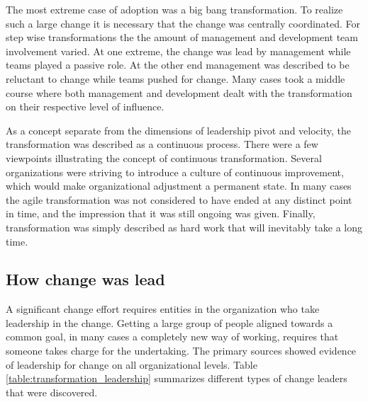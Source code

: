 The most extreme case of adoption was a big bang transformation. To realize such
a large change it is necessary that the change was centrally coordinated.
For step wise transformations the the amount of management and development team
involvement varied. At one extreme, the change was lead by management while
teams played a passive role. At the other end management was described to be
reluctant to change while teams pushed for change. Many cases took a middle
course where both management and development dealt with the transformation on
their respective level of influence.

As a concept separate from the dimensions of leadership pivot and velocity, the
transformation was described as a continuous process. There were a few
viewpoints illustrating the concept of continuous transformation. Several
organizations were striving to introduce a culture of continuous improvement,
which would make organizational adjustment a permanent state. In many cases the
agile transformation was not considered to have ended at any distinct point in
time, and the impression that it was still ongoing was given. Finally,
transformation was simply described as hard work that will inevitably take a
long time.















\subsection{How change was lead}

A significant change effort requires entities in the organization who take
leadership in the change. Getting a large group of people aligned towards a
common goal, in many cases a completely new way of working, requires that
someone takes charge for the undertaking. The primary sources showed evidence of
leadership for change on all organizational levels. Table
\ref{table:transformation_leadership} summarizes different types of change
leaders that were discovered.


